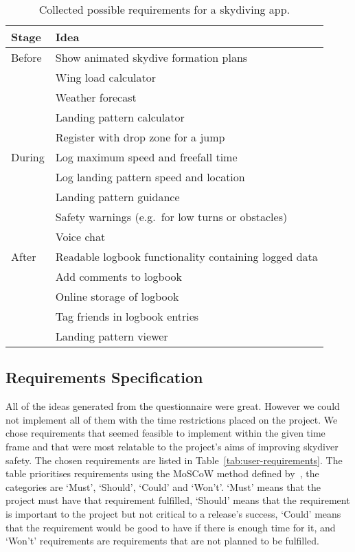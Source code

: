 \begin{table*}[ht]
  \centering
  \caption{Collected possible requirements for a skydiving app.}\label{tab:user-ideas}
  \begin{tabular}{@{}ll@{}}
    \toprule
    Stage  & Idea \\
    \midrule
    Before & Show animated skydive formation plans \\
           & Wing load calculator \\
           & Weather forecast \\
           & Landing pattern calculator \\
           & Register with drop zone for a jump \\
    During & Log maximum speed and freefall time \\
           & Log landing pattern speed and location \\
           & Landing pattern guidance \\
           & Safety warnings (e.g.\ for low turns or obstacles) \\
           & Voice chat \\
    After  & Readable logbook functionality containing logged data \\
           & Add comments to logbook \\
           & Online storage of logbook \\
           & Tag friends in logbook entries \\
           & Landing pattern viewer \\
    \bottomrule
  \end{tabular}
\end{table*}

\subsection{Requirements Specification}
All of the ideas generated from the questionnaire were great. However we could not implement all of them with the time restrictions placed on the project. We chose requirements that seemed feasible to implement within the given time frame and that were most relatable to the project's aims of improving skydiver safety. The chosen requirements are listed in Table~\vref{tab:user-requirements}. The table prioritises requirements using the MoSCoW method defined by~\citeauthor{clegg_case_1994}, the categories are `Must', `Should', `Could' and `Won't'. `Must' means that the project must have that requirement fulfilled, `Should' means that the requirement is important to the project but not critical to a release's success, `Could' means that the requirement would be good to have if there is enough time for it, and `Won't' requirements are requirements that are not planned to be fulfilled.


